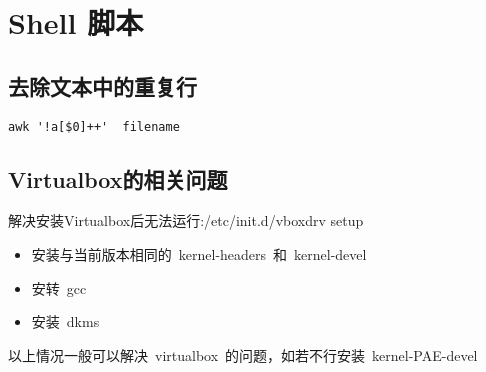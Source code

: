 \chapter{Shell 脚本}

\section{去除文本中的重复行}
\begin{verbatim}
awk '!a[$0]++'  filename
\end{verbatim}

\section{Virtualbox的相关问题}
解决安装Virtualbox后无法运行:/etc/init.d/vboxdrv setup \\
\begin{itemize}
\item 安装与当前版本相同的~kernel-headers~和~kernel-devel~ \\
\item 安转~gcc \\
\item 安装~dkms \\
\end{itemize} 
以上情况一般可以解决~virtualbox~的问题，如若不行安装~kernel-PAE-devel